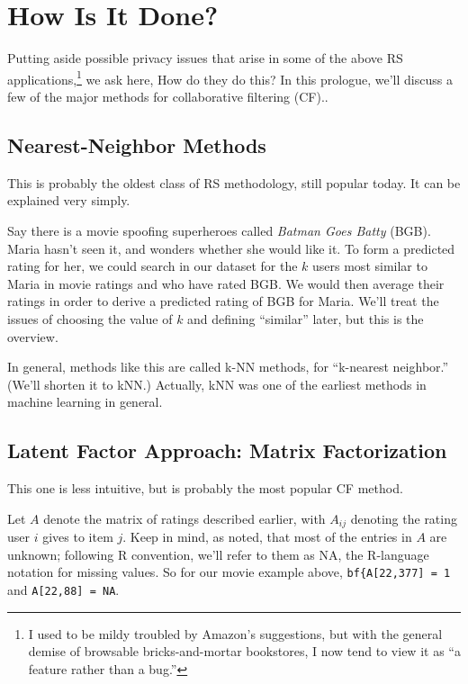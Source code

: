 \section{How Is It Done?}

Putting aside possible privacy issues that arise in some of the above RS
applications,\footnote{I used to be mildy
troubled by Amazon's suggestions, but with the general demise of
browsable bricks-and-mortar bookstores, I now tend to view it as ``a
feature rather than a bug.''} we ask here, How do they do this?  In this
prologue, we'll discuss a few of the major methods for collaborative
filtering (CF)..

\subsection{Nearest-Neighbor Methods}

This is probably the oldest class of RS methodology, still popular
today.  It can be explained very simply.

Say there is a movie spoofing superheroes called \textit{Batman Goes
Batty} (BGB).  Maria hasn't seen it, and wonders whether she would like
it.  To form a predicted rating for her, we could search in our dataset
for the $k$ users most similar to Maria in movie ratings and who have
rated BGB.  We would then average their ratings in order to derive a
predicted rating of BGB for Maria.  We'll treat the issues of choosing
the value of $k$ and defining ``similar'' later, but this is the
overview.

In general, methods like this are called k-NN methods,
for ``k-nearest neighbor.''  (We'll shorten it to kNN.)
Actually, kNN was one of the earliest methods in machine learning in
general.

\subsection{Latent Factor Approach:  Matrix Factorization}
\label{mf}

This one is less intuitive, but is probably the most popular CF method.

Let $A$ denote the matrix of ratings described earlier, with $A_{ij}$
denoting the rating user $i$ gives to item $j$.  Keep in mind, as noted,
that most of the entries in $A$ are unknown; following R convention,
we'll refer to them as NA, the R-language notation for missing values.  
So for our movie example above, \lstinline{bf{A[22,377] = 1} and
\lstinline{A[22,88] = NA}.

